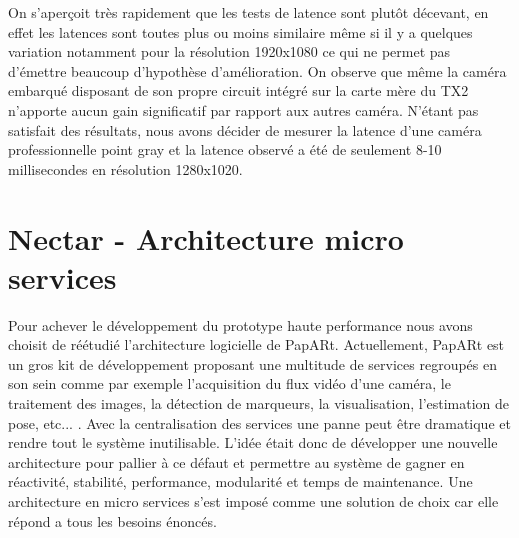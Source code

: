 \begin{table}[H]
\centering
\caption{Latence de plusieurs caméra mesuré en Glass to glass - NVIDIA Jetson TX2}
\label{fig:latency:camera}
\end{table}

On s'aperçoit très rapidement que les tests de latence sont plutôt décevant, en effet les latences sont toutes plus ou moins similaire même si il y a quelques variation notamment pour la résolution 1920x1080 ce qui ne permet pas d'émettre beaucoup d'hypothèse d'amélioration. On observe que même la caméra embarqué disposant de son propre circuit intégré sur la carte mère du TX2 n'apporte aucun gain significatif par rapport aux autres caméra.
N'étant pas satisfait des résultats, nous avons décider de mesurer la latence d'une caméra professionnelle point gray et la latence observé a été de seulement 8-10 millisecondes en résolution 1280x1020. %

\newpage
\section{Nectar - Architecture micro services}
\label{sec:nectararchi}

Pour achever le développement du prototype haute performance nous avons choisit de réétudié l'architecture logicielle de PapARt. Actuellement, PapARt est un gros kit de développement proposant une multitude de services regroupés en son sein comme par exemple l'acquisition du flux vidéo d'une caméra, le traitement des images, la détection de marqueurs, la visualisation, l'estimation de pose, etc... . Avec la centralisation des services une panne peut être dramatique et rendre tout le système inutilisable.
L'idée était donc de développer une nouvelle architecture pour pallier à ce défaut et permettre au système de gagner en réactivité, stabilité, performance, modularité et temps de maintenance. Une architecture en micro services s'est imposé comme une solution de choix car elle répond a tous les besoins énoncés.

